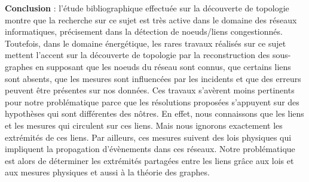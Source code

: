 \newline
{\bf Conclusion} :
l'\'etude bibliographique effectu\'ee sur la d\'ecouverte de topologie montre que la recherche sur ce sujet  est tr\`es active dans le domaine des r\'eseaux informatiques, pr\'ecisement dans la d\'etection de noeuds/liens congestionn\'es. 
Toutefois, dans le domaine \'energ\'etique, les rares travaux r\'ealis\'es sur ce sujet mettent l'accent sur la d\'ecouverte de topologie par la reconstruction des sous-graphes en supposant que les noeuds du r\'eseau sont connus, 
que certains liens sont absents, 
que les mesures sont influenc\'ees par les incidents 
et que des erreurs peuvent \^etre pr\'esentes sur nos donn\'ees. 
Ces travaux s'av\`erent moins pertinents pour notre probl\'ematique parce  que les r\'esolutions propos\'ees s'appuyent sur des hypoth\`eses qui sont diff\'erentes des n\^otres. 
En effet, nous connaissons que les liens et les mesures qui circulent sur ces liens. 
Mais nous ignorons exactement les extr\'emit\'es de ces liens.
Par ailleurs, ces mesures suivent  des lois physiques qui impliquent la propagation d'\'ev\`enements dans ces r\'eseaux.
Notre probl\'ematique est alors de d\'eterminer les extr\'emit\'es partag\'ees entre les liens  gr\^ace aux lois et aux mesures physiques et aussi \`a la th\'eorie des graphes.


